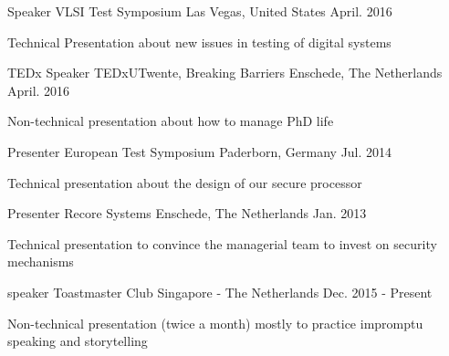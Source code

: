 

\begin{cventries}

  \cventry
    {Speaker} %
    { VLSI Test Symposium} %
    {Las Vegas, United States} %
    {April. 2016} %
    {
      \begin{cvitems} %
        \item {Technical Presentation about new issues in testing of digital systems}
      \end{cvitems}
    }

  \cventry
    {TEDx Speaker} %
    {TEDxUTwente, Breaking Barriers} %
    {Enschede, The Netherlands} %
    {April. 2016} %
    {
      \begin{cvitems} %
        \item {Non-technical presentation about how to manage PhD life}
      \end{cvitems}
    }

  \cventry
    {Presenter} %
    {European Test Symposium} %
    {Paderborn, Germany} %
    {Jul. 2014} %
    {
      \begin{cvitems} %
        \item {Technical presentation about the design of our secure processor}
      \end{cvitems}
    }

  \cventry
    {Presenter} %
    {Recore Systems} %
    {Enschede, The Netherlands} %
    {Jan. 2013} %
    {
      \begin{cvitems} %
        \item {Technical presentation to convince the managerial team to invest on security mechanisms}
      \end{cvitems}
    }

  \cventry
    {speaker} %
    {Toastmaster Club} %
    {Singapore - The Netherlands} %
    {Dec. 2015 - Present} %
    {
      \begin{cvitems} %
        \item {Non-technical presentation (twice a month) mostly to practice impromptu speaking and storytelling}
      \end{cvitems}
    }

\end{cventries}
